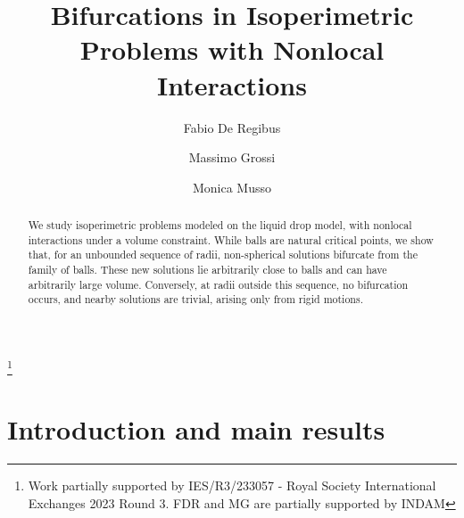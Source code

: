 \documentclass[10pt,reqno,english]{amsart}
\theoremstyle{definition}
\numberwithin{equation}{section}
\begin{document}
		
	\title{Bifurcations in Isoperimetric Problems with Nonlocal Interactions}
		
	\author[F. De Regibus]{Fabio De Regibus}
	\address{\noindent F.D.R.:  Department of Mathematical Sciences University of Bath, Bath BA2 7AY, United Kingdom.}
	
	\author[M. Grossi]{Massimo Grossi}
	\address{\noindent M.G.: Dipartimento di Scienze di Base Applicate per l'Ingengeria Sapienza Università di Roma, via Antonio Scarpa 16, 00161 Roma, Italy}
	
	\author[M. Musso]{Monica Musso}
	\address{\noindent M.M.:  Department of Mathematical Sciences University of Bath, Bath BA2 7AY, United Kingdom.}

\thanks{ Work partially supported by IES/R3/233057 - Royal Society International Exchanges 2023 Round 3. FDR and MG are partially supported by INDAM}


\begin{abstract}
We study isoperimetric problems modeled on the liquid drop model, with nonlocal interactions under a volume constraint. While balls are natural critical points, we show that, for an unbounded sequence of radii, non-spherical solutions bifurcate from the family of balls. These new solutions lie arbitrarily close to balls and can have arbitrarily large volume. Conversely, at radii outside this sequence, no bifurcation occurs, and nearby solutions are trivial, arising only from rigid motions. 
\end{abstract}

\maketitle


\section{Introduction and main results}
\label{sec_intro}
\end{document}
